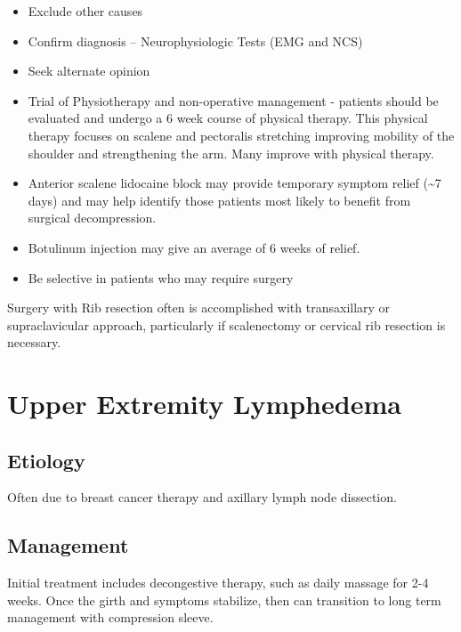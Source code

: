 \documentclass[
]{book}
\begin{document}
\begin{itemize}
\item
  Exclude other causes
\item
  Confirm diagnosis -- Neurophysiologic Tests (EMG and NCS)
\item
  Seek alternate opinion
\item
  Trial of Physiotherapy and non-operative management - patients
  should be evaluated and undergo a 6 week course of physical therapy.
  This physical therapy focuses on scalene and pectoralis stretching
  improving mobility of the shoulder and strengthening the arm. Many
  improve with physical therapy.
  \citep{baldermanPhysicalTherapyManagement2019}
\item
  Anterior scalene lidocaine block may provide temporary symptom
  relief (\textasciitilde7 days) and may help identify those patients most likely
  to benefit from surgical decompression.
  \citep{salhanPC214UltrasoundGuidedAnesthetic2016, lumImpactAnteriorScalene2012}
\item
  Botulinum injection may give an average of 6 weeks of relief.
  \citep{salhanPC214UltrasoundGuidedAnesthetic2016}
\item
  Be selective in patients who may require surgery
\end{itemize}

Surgery with Rib resection often is accomplished with transaxillary or
supraclavicular approach, particularly if scalenectomy or cervical rib
resection is necessary.

\hypertarget{sec-upper-extremity-lymphedema}{%
\section{Upper Extremity Lymphedema}\label{sec-upper-extremity-lymphedema}}

\hypertarget{etiology-8}{%
\subsection{Etiology}\label{etiology-8}}

Often due to breast cancer therapy and axillary lymph node
dissection.\citep{morrell2005}

\hypertarget{management-14}{%
\subsection{Management}\label{management-14}}

Initial treatment includes decongestive therapy, such as daily massage
for 2-4 weeks. Once the girth and symptoms stabilize, then can
transition to long term management with compression sleeve.\citep{mondry2004}
\end{document}
